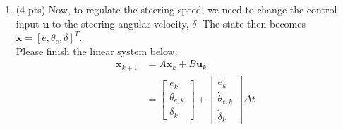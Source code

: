\documentclass[11pt]{article}
\begin{document}
\begin{enumerate}
{            For the State Weight Matrix $Q$, I assigned the highest weight to the cross-track error $e$ to prioritize staying on the path, and a moderately high weight to the heading error $\theta_e$ to keep the vehicle aligned. For the Control Weight Matrix $R$, I penalized steering angle effort enough to avoid aggressive, jerky steering that could lead to instability at high speeds, while still maintaining responsiveness.
            The tuned weighting matrices are represented as:
            \begin{equation}
            Q = \begin{bmatrix} 
            10.0 & 0 & 0 \\ 
            0 & 1.0 & 0 \\ 
            0 & 0 & 1.0 
            \end{bmatrix}, \quad R = \begin{bmatrix} 500.0 \end{bmatrix}
            \end{equation}
            By setting $Q_{1,1} = 10.0$, the controller aggressively minimizes lateral deviation. The high penalty of $R = 500.0$ on the steering angular velocity $\dot{\delta}$ ensures that the control action remains smooth and physically feasible for the steering actuators, preventing oscillations during high-speed maneuvers.
            }
    \item \textbf{\faPen} (4 pts) Now, to regulate the steering speed, we need to change the control input $\mathbf{u}$ to the steering angular velocity, $\dot{\delta}$.
          The state then becomes $\mathbf{x} = [e, \theta_e, \delta]^T$. \\
          Please finish the linear system below:
                    \begin{equation*}
              \begin{split}
                  \mathbf{x}_{k+1} & = A \mathbf{x}_k + B \mathbf{u}_k                                                                                                                                                                                                                                                                                                        \\
                                   & = \begin{bmatrix} e_k \\ \theta_{e,k} \\ \delta_k \end{bmatrix} + \begin{bmatrix} \dot{e_k} \\ \dot{\theta}_{e,k} \\ \dot{\delta}_k \end{bmatrix} \Delta t                                                                                                                                                                               \\

\end{split}
\end{equation*}
\end{enumerate}
\end{document}
